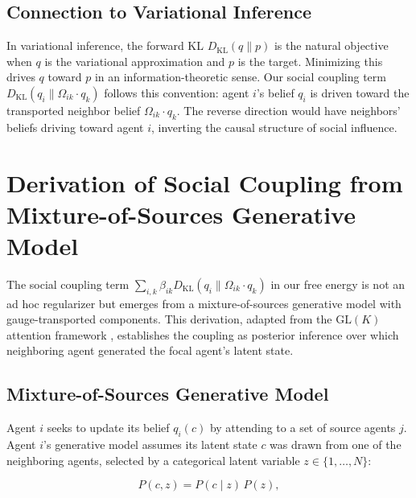 \documentclass[12pt]{article}
\begin{document}
\subsection{Connection to Variational Inference}

In variational inference, the forward KL $D_{\mathrm{KL}}(q \| p)$ is the natural objective when $q$ is the variational approximation and $p$ is the target. Minimizing this drives $q$ toward $p$ in an information-theoretic sense. Our social coupling term $D_{\mathrm{KL}}(q_i \| \Omega_{ik}\cdot q_k)$ follows this convention: agent $i$'s belief $q_i$ is driven toward the transported neighbor belief $\Omega_{ik}\cdot q_k$. The reverse direction would have neighbors' beliefs driving toward agent $i$, inverting the causal structure of social influence.


\section{Derivation of Social Coupling from Mixture-of-Sources Generative Model}
\label{app:social_coupling}

The social coupling term $\sum_{i,k} \beta_{ik} D_{\mathrm{KL}}(q_i \| \Omega_{ik}\cdot q_k)$ in our free energy is not an ad hoc regularizer but emerges from a mixture-of-sources generative model with gauge-transported components. This derivation, adapted from the $\mathrm{GL}(K)$ attention framework \citep{Dennis2025trans}, establishes the coupling as posterior inference over which neighboring agent generated the focal agent's latent state.

\subsection{Mixture-of-Sources Generative Model}

Agent $i$ seeks to update its belief $q_i(c)$ by attending to a set of source agents $j$. Agent $i$'s generative model assumes its latent state $c$ was drawn from one of the neighboring agents, selected by a categorical latent variable $z \in \{1, \ldots, N\}$:

\begin{equation}
P(c, z) = P(c \mid z)\, P(z),
\label{eq:mixture_joint}
\end{equation}
\end{document}
